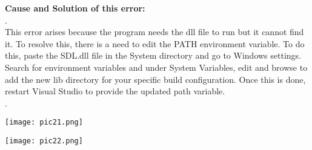 \documentclass{article}
\begin{document}
\begin{flushleft}
		\textbf{Cause and Solution of this error:}\\.\\
		This error arises because the program needs the dll file to run but it cannot find it. To resolve this, there is a need to edit the PATH environment variable. To do this, paste the SDL.dll file in the System directory and go to Windows settings. Search for environment variables and under System Variables, edit and browse to add the new lib directory for your specific build configuration. Once this is done, restart Visual Studio to provide the updated path variable.\\.\\
		\begin{center}
			\texttt{[image: pic21.png]}
		\end{center}
		\begin{center}
		\texttt{[image: pic22.png]}
	\end{center}
		
		
	\end{flushleft}
	
\end{document}

